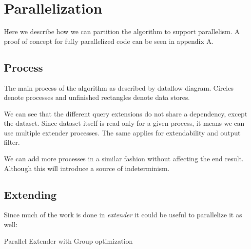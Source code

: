 \chapter{Parallelization}

Here we describe how we can partition the algorithm to support parallelism. A proof of concept for fully parallelized code can be seen in appendix A.

\section{Process}

The main process of the algorithm as described by dataflow diagram.\cite{Kahn74,Lee95} Circles denote processes and unfinished rectangles denote data stores.

\begin{figure}[H]
	
\end{figure}

We can see that the different query extensions do not share a dependency, except the dataset. Since dataset itself is read-only for a given process, it means we can use multiple extender processes. The same applies for extendability and output filter.

\begin{figure}[H]
	
\end{figure}

We can add more processes in a similar fashion without affecting the end result. Although this will introduce a source of indeterminism.

\section{Extending}


Since much of the work is done in \emph{extender} it could be useful to parallelize it as well:

\begin{algorithm}[H]
	\caption{Parallel Extender with Group optimization}
\begin{algorithmic}[1]

\end{algorithmic}
\end{algorithm}


